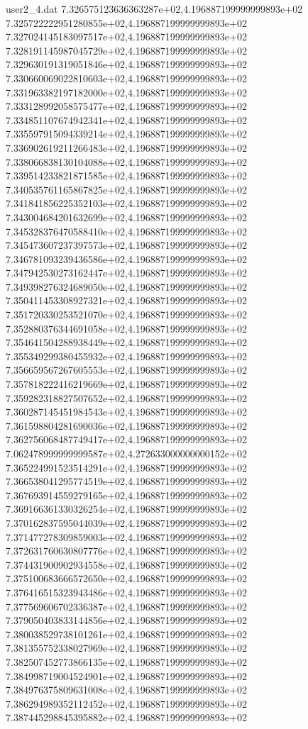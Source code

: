 \begin{filecontents}{user2_4.dat}
7.326575123636363287e+02,4.196887199999999893e+02
7.325722222951280855e+02,4.196887199999999893e+02
7.327024145183097517e+02,4.196887199999999893e+02
7.328191145987045729e+02,4.196887199999999893e+02
7.329630191319051846e+02,4.196887199999999893e+02
7.330660069022810603e+02,4.196887199999999893e+02
7.331963382197182000e+02,4.196887199999999893e+02
7.333128992058575477e+02,4.196887199999999893e+02
7.334851107674942341e+02,4.196887199999999893e+02
7.335597915094339214e+02,4.196887199999999893e+02
7.336902619211266483e+02,4.196887199999999893e+02
7.338066838130104088e+02,4.196887199999999893e+02
7.339514233821871585e+02,4.196887199999999893e+02
7.340535761165867825e+02,4.196887199999999893e+02
7.341841856225352103e+02,4.196887199999999893e+02
7.343004684201632699e+02,4.196887199999999893e+02
7.345328376470588410e+02,4.196887199999999893e+02
7.345473607237397573e+02,4.196887199999999893e+02
7.346781093239436586e+02,4.196887199999999893e+02
7.347942530273162447e+02,4.196887199999999893e+02
7.349398276324689050e+02,4.196887199999999893e+02
7.350411453308927321e+02,4.196887199999999893e+02
7.351720330253521070e+02,4.196887199999999893e+02
7.352880376344691058e+02,4.196887199999999893e+02
7.354641504288938449e+02,4.196887199999999893e+02
7.355349299380455932e+02,4.196887199999999893e+02
7.356659567267605553e+02,4.196887199999999893e+02
7.357818222416219669e+02,4.196887199999999893e+02
7.359282318827507652e+02,4.196887199999999893e+02
7.360287145451984543e+02,4.196887199999999893e+02
7.361598804281690036e+02,4.196887199999999893e+02
7.362756068487749417e+02,4.196887199999999893e+02
7.062478999999999587e+02,4.272633000000000152e+02
7.365224991523514291e+02,4.196887199999999893e+02
7.366538041295774519e+02,4.196887199999999893e+02
7.367693914559279165e+02,4.196887199999999893e+02
7.369166361330326254e+02,4.196887199999999893e+02
7.370162837595044039e+02,4.196887199999999893e+02
7.371477278309859003e+02,4.196887199999999893e+02
7.372631760630807776e+02,4.196887199999999893e+02
7.374431900902934558e+02,4.196887199999999893e+02
7.375100683666572650e+02,4.196887199999999893e+02
7.376416515323943486e+02,4.196887199999999893e+02
7.377569606702336387e+02,4.196887199999999893e+02
7.379050403833144856e+02,4.196887199999999893e+02
7.380038529738101261e+02,4.196887199999999893e+02
7.381355752338027969e+02,4.196887199999999893e+02
7.382507452773866135e+02,4.196887199999999893e+02
7.384998719004524901e+02,4.196887199999999893e+02
7.384976375809631008e+02,4.196887199999999893e+02
7.386294989352112452e+02,4.196887199999999893e+02
7.387445298845395882e+02,4.196887199999999893e+02

\end{filecontents}
